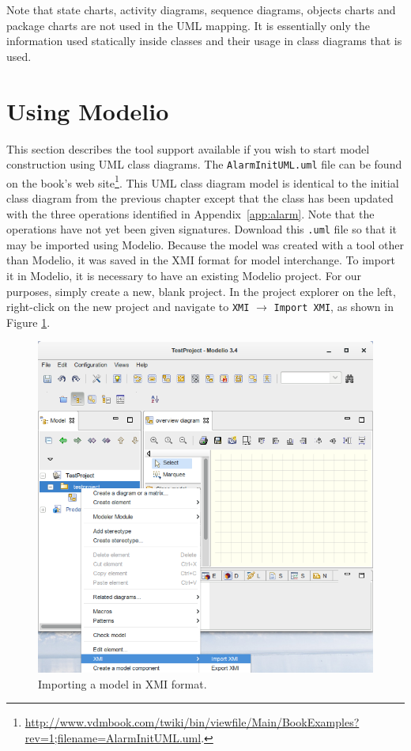 
Note that state charts, activity diagrams, sequence diagrams, objects charts and package charts are not used in the UML mapping. It is essentially only the information used statically inside classes and their usage in class diagrams that is used.
%
\section{Using Modelio}\label{sec:Rose}
This section describes the tool support available if you wish to start model construction using UML class diagrams. The \texttt{AlarmInitUML.uml} file can be found on the book's web site\footnote{\url{http://www.vdmbook.com/twiki/bin/viewfile/Main/BookExamples?rev=1;filename=AlarmInitUML.uml}.}.
This UML class diagram model is identical to the initial class diagram from the previous chapter except that the  class has been updated with the three operations identified in Appendix~\ref{app:alarm}.
Note that the operations have not yet been given signatures. Download this \texttt{.uml} file so that it may be imported using Modelio.  Because the model was created with a tool other than Modelio, it was saved in the XMI format for model interchange.  To import it in Modelio, it is necessary to have an existing Modelio project.  For our purposes, simply create a new, blank project.  In the project explorer on the left, right-click on the new project and navigate to \texttt{XMI} $\rightarrow$ \texttt{Import XMI}, as shown in Figure \ref{fig:importxmi}.
%
\begin{figure}[htbp]
\begin{center}
\includegraphics[width=5in]{figures/importxmi.png}
\caption{Importing a model in XMI format.}
\label{fig:importxmi}
\end{center}
\end{figure}
